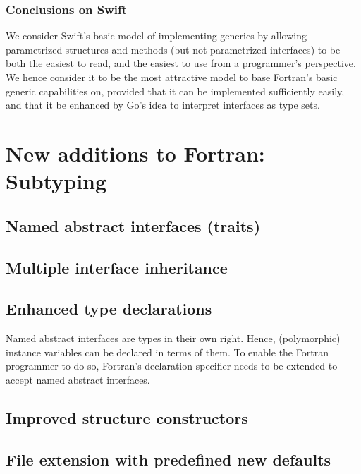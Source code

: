 \documentclass[11pt,oneside]{article}
\newcommand{\code}[1]{{\selectfont\ttfamily{#1}}}
\begin{document}
\subsubsection{Conclusions on Swift}

We consider Swift's basic model of implementing generics by allowing
parametrized structures and methods (but not parametrized interfaces)
to be both the easiest to read, and the easiest to use from a
programmer's perspective. We hence consider it to be the most
attractive model to base Fortran's basic generic capabilities on,
provided that it can be implemented sufficiently easily, and that it
be enhanced by Go's idea to interpret interfaces as type sets.



\newpage

\section{New additions to Fortran: Subtyping}

\subsection{Named abstract interfaces (traits)}

\subsection{Multiple interface inheritance}

\subsection{Enhanced type declarations}

Named abstract interfaces are types in their own right. Hence,
(polymorphic) instance variables can be declared in terms of them. To
enable the Fortran programmer to do so, Fortran's \code{type}
declaration specifier needs to be extended to accept named abstract
interfaces.

\subsection{Improved structure constructors}

\subsection{File extension with predefined new defaults}
\end{document}
